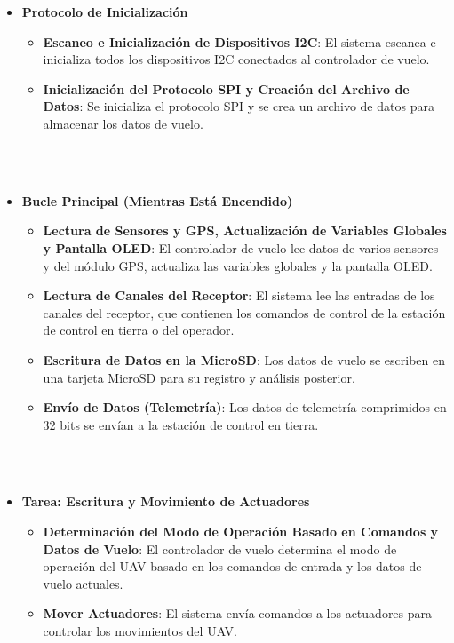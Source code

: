 \begin{itemize}
    \item \textbf{Protocolo de Inicialización}
    \begin{itemize}
        \item \textbf{Escaneo e Inicialización de Dispositivos I2C}: El sistema escanea e inicializa todos los dispositivos I2C conectados al controlador de vuelo.
        \item \textbf{Inicialización del Protocolo SPI y Creación del Archivo de Datos}: Se inicializa el protocolo SPI y se crea un archivo de datos para almacenar los datos de vuelo.
    \end{itemize}
    \\ \\ 
    \item \textbf{Bucle Principal (Mientras Está Encendido)}
    \begin{itemize}
        \item \textbf{Lectura de Sensores y GPS, Actualización de Variables Globales y Pantalla OLED}: El controlador de vuelo lee datos de varios sensores y del módulo GPS, actualiza las variables globales y la pantalla OLED.
        \item \textbf{Lectura de Canales del Receptor}: El sistema lee las entradas de los canales del receptor, que contienen los comandos de control de la estación de control en tierra o del operador.
        \item \textbf{Escritura de Datos en la MicroSD}: Los datos de vuelo se escriben en una tarjeta MicroSD para su registro y análisis posterior.
        \item \textbf{Envío de Datos (Telemetría)}: Los datos de telemetría comprimidos en 32 bits se envían a la estación de control en tierra.
    \end{itemize}
    \\ \\ 
    \item \textbf{Tarea: Escritura y Movimiento de Actuadores}
    \begin{itemize}
        \item \textbf{Determinación del Modo de Operación Basado en Comandos y Datos de Vuelo}: El controlador de vuelo determina el modo de operación del UAV basado en los comandos de entrada y los datos de vuelo actuales.
        \item \textbf{Mover Actuadores}: El sistema envía comandos a los actuadores para controlar los movimientos del UAV.
    \end{itemize}
\end{itemize}
\\  \\ 
